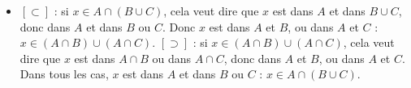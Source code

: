 {{\begin{itemize}[label=\textbullet]
    $[\supset]$ : si $x\in (A\cup B)\cap(A\cup C)$, cela veut dire que $x$ est dans$A\cup B$ et dans $A\cup C$. Donc $x$ est dans $A$, ou alors il est dans $B$ et $C$, donc dans $A$ ou dans $B\cap C$ : $x \in A\cup (B\cap C)$.
    \item $[\subset]$ : si $x\in A\cap (B\cup C)$, cela veut dire que $x$ est dans $A$ et dans $B\cup C$, donc dans $A$ et dans $B$ ou $C$. Donc $x$ est dans $A$ et $B$, ou dans $A$ et $C$ : $x \in (A\cap B)\cup(A\cap C)$.
    $[\supset]$ : si $x \in (A\cap B)\cup(A\cap C)$, cela veut dire que $x$ est dans $A\cap B$ ou dans $A\cap C$, donc dans $A$ et $B$, ou dans $A$ et $C$. Dans tous les cas, $x$ est dans $A$ et dans $B$ ou $C$ : $x \in A\cap(B\cup C)$.
\end{itemize}}
}
